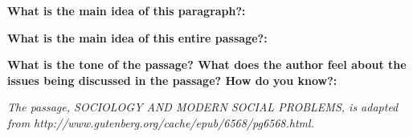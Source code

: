\begin{enumerate}
\begin{linenumbers}
\end{linenumbers}

\textbf{What is the main idea of this paragraph?:} \hrulefill

\hrulefill

\textbf{What is the main idea of this entire passage?:} \hrulefill

\hrulefill

\hrulefill

\textbf{What is the tone of the passage? What does the author feel about the issues being discussed in the passage? How do you know?:} \hrulefill

\hrulefill

\hrulefill

\textit{The passage, SOCIOLOGY AND MODERN SOCIAL PROBLEMS, is adapted from http://www.gutenberg.org/cache/epub/6568/pg6568.html. }
\end{enumerate}
